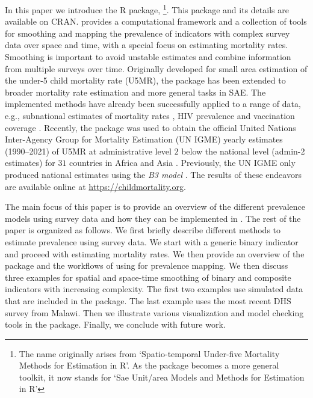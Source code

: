 In this paper we introduce the R package, \footnote{The name originally arises from `Spatio-temporal Under-five Mortality Methods for Estimation in R'. As the package becomes a more general toolkit, it now stands for `Sae Unit/area Models and Methods for Estimation in R'}. This package and its details are available on CRAN.  provides a computational framework and a collection of tools for smoothing and mapping the prevalence of indicators with complex survey data over space and time, with a special focus on estimating mortality rates. Smoothing is important to avoid unstable estimates and combine information from multiple surveys over time. Originally developed for small area estimation of the under-5 child mortality rate (U5MR), the  package has been extended to broader mortality rate estimation and more general tasks in SAE. The implemented methods have already been successfully applied to a range of data, e.g., subnational estimates of mortality rates \citep{mercer_etal_15, li_etal_19, schluter2021space, fuglstad2021two}, HIV prevalence \citep{wakefield_okonek_pedersen_20} and vaccination coverage \citep{dong_wakefield_20}. Recently, the  package was used to obtain the official United Nations Inter-Agency Group for Mortality Estimation (UN IGME) yearly estimates (1990--2021) of U5MR at administrative level \(2\) below the national level (admin-2 estimates) for \(31\) countries in Africa and Asia \citep{un2023}. Previously, the UN IGME only produced national estimates using the \emph{B3 model} \citep{alkema_new_14}. The results of these endeavors are available online at \url{https://childmortality.org}.

The main focus of this paper is to provide an overview of the different prevalence models using survey data and how they can be implemented in . The rest of the paper is organized as follows. We first briefly describe different methods to estimate prevalence using survey data. We start with a generic binary indicator and proceed with estimating mortality rates. We then provide an overview of the  package and the workflows of using  for prevalence mapping. We then discuss three examples for spatial and space-time smoothing of binary and composite indicators with increasing complexity. The first two examples use simulated data that are included in the  package. The last example uses the most recent DHS survey from Malawi. Then we illustrate various visualization and model checking tools in the  package. Finally, we conclude with future work.

